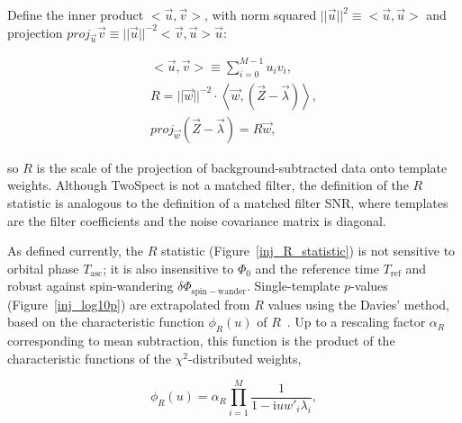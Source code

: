 \documentclass[12pt]{iopart}
\begin{document}
\noindent Define the inner product $<\vec{u}, \vec{v}>$, with norm squared $||\vec{u}||^2 \equiv <\vec{u}, \vec{u}>$ and projection $\mathit{proj}_{\vec{u}} \vec{v} \equiv ||\vec{u}||^{-2} <\vec{v}, \vec{u}> \vec{u}$:

\begin{eqnarray}
<\vec{u}, \vec{v}> \equiv \sum_{i=0}^{M-1} u_i v_i,\\
R = ||\vec{w}||^{-2} \cdot \left<\vec{w}, (\vec{Z} - \vec{\lambda})\right>,\\
\mathit{proj}_{\vec{w}} \left(\vec{Z} - \vec{\lambda} \right) = R \vec{w},
\label{TwoSpect_R_statistic_as_projection}
\end{eqnarray}

\noindent so $R$ is the scale of the projection of background-subtracted data onto template weights.
Although TwoSpect is not a matched filter, the definition of the $R$ statistic is analogous to the definition of a matched filter SNR, where templates are the filter coefficients and the noise covariance matrix is diagonal.




As defined currently, the $R$ statistic 
(Figure~\ref{inj_R_statistic})
is not sensitive to orbital phase $T_\mathrm{asc}$; it is also insensitive to $\Phi_0$ and the reference time $T_\mathrm{ref}$ and robust against spin-wandering $\delta \Phi_\mathrm{spin-wander}$.
Single-template $p$-values (Figure~\ref{inj_log10p}) are extrapolated from $R$ values using the Davies' method, based on the characteristic function $\phi_R (u)$ of $R$~\cite{GoetzTwoSpectMethods2011}.
Up to a rescaling factor $\alpha_R$ corresponding to mean subtraction, this function is the product of the characteristic functions of the $\chi^2$-distributed weights, 

\begin{equation}
\phi_R(u) = \alpha_R \prod\limits_{i=1}^{M} \frac{1}{1 - \mathrm{i} u w'_i \lambda_i},
\end{equation}
\end{document}
